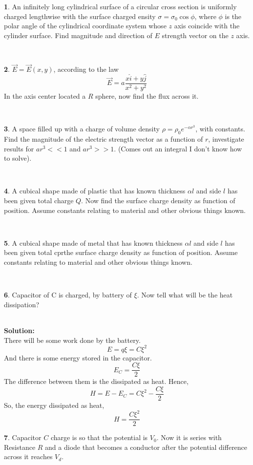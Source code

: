 \documentclass[a4paper]{article}
\theoremstyle{definition}
\newtheorem{prob}{ \framebox[0.09\textwidth]{{\sffamily Pr}} }
\newcommand{\pr}[1]{ \begin{tcolorbox} \begin{prob} 
    #1 
\end{prob} 
   \end{tcolorbox}\ 
   \\
 }
\begin{document}



\pr{ An infinitely long cylindrical surface of a circular cross section is uniformly charged lengthwise with the surface charged
ensity $\sigma = \sigma _0 \cos \phi$, where $\phi$ is the polar angle of the cylindrical coordinate system whose $z$ axis coincide with the
cylinder surface. Find magnitude and direction of $E$ strength vector on the $z$ axis. 
}





\pr{ $\vec{E} = \vec{E}(x,y)$, according to the law 
\[ \vec{E} = a \frac{ x \hat{i} + y \hat{j} }{x^2 + y^2} \]
In the axis center located a $R$ sphere, now find the flux across it.  
}





\pr{ A space filled up with a charge of volume density $\rho = \rho _0 e^{-\alpha r^3} $, with constants. Find the magnitude
of the electric strength vector as a function of $r$, investigate results for $ar^3 <<1$ and $ar^3 >>1$. (Comes out an integral I don't know
how to solve).  }




\pr{ A cubical shape made of plastic that has known thickness $\alpha l$ and side $l$ has been given total charge $Q$. Now find
the surface charge density as function of position. Assume constants relating to material and other obvious things known.}





\pr{ A cubical shape made of metal that has known thickness $\alpha l$ and side $l$ has been given total
cprthe surface charge density as function of position. Assume
constants relating to material and other obvious things known. 
}

\pr{Capacitor of C is charged, by battery of $\xi$. Now tell 
what will be the heat dissipation?}
\textbf{Solution:} \\
There will be some work done by the battery.
\[ E = q \xi = C \xi ^2 \]
And there is some energy stored in the capacitor. 
\[ E_C = \frac{C \xi}{2} \] 
The difference between them is the dissipated as heat. 
Hence, 
\[ H = E - E_C = C \xi ^2 - \frac{C \xi }{2} \] 
So, the energy dissipated as heat, 
\begin{equation}
H = \frac{ C \xi^2}{2} 
\end{equation}
\pr{Capacitor $C$ charge is so that the potential is $V_0$.
Now it is series with Resistance $R$ and a diode that 
becomes a conductor after the potential difference across it
reaches $V_d$. }
\end{document}
